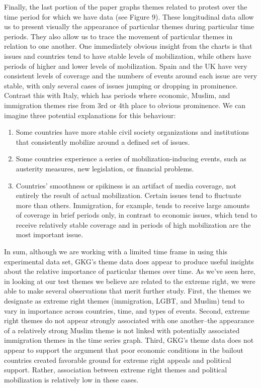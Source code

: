 \documentclass[10pt]{article}
\begin{document}
Finally, the last portion of the paper graphs themes related to protest over the time period for which we have data (see Figure 9).  These longitudinal data allow us to present visually the appearance of particular themes during particular time periods.  They also allow us to trace the movement of particular themes in relation to one another.  One immediately obvious insight from the charts is that issues and countries tend to have stable levels of mobilization, while others have periods of higher and lower levels of mobilization.  Spain and the UK have very consistent levels of coverage and the numbers of events around each issue are very stable, with only several cases of issues jumping or dropping in prominence. Contrast this with Italy, which has periods where economic, Muslim, and immigration themes rise from 3rd or 4th place to obvious prominence. We can imagine three potential explanations for this behaviour:
\begin{enumerate}
\item Some countries have more stable civil society organizations  and institutions that consistently mobilize around a defined set of issues.
\item Some countries experience a series of mobilization-inducing events, such as austerity measures, new legislation, or financial problems.
\item Countries' smoothness or spikiness is an artifact of media coverage, not entirely the result of actual mobilization.  Certain issues tend to fluctuate more than others. Immigration, for example, tends to receive large amounts of coverage in brief periods only, in contrast to economic issues, which tend to receive relatively stable coverage and in periods of high mobilization are the most important issue.
\end{enumerate}

In sum, although we are working with a limited time frame in using this experimental data set, GKG's theme data does appear to produce useful insights about the relative importance of particular themes over time.  As we've seen here, in looking at our test themes we believe are related to the extreme right, we were able to make several observations that merit further study.  First, the themes we designate as extreme right themes (immigration, LGBT, and Muslim) tend to vary in importance across countries, time, and types of events.  Second, extreme right themes do not appear strongly associated with one another--the appearance of a relatively strong Muslim theme is not linked with potentially associated immigration themes in the time series graph.  Third, GKG's theme data does not appear to support the argument that poor economic conditions in the bailout countries created  favorable ground for extreme right appeals and political support. Rather, association between extreme right themes and political mobilization is relatively low in these cases.
\FloatBarrier
\end{document}
